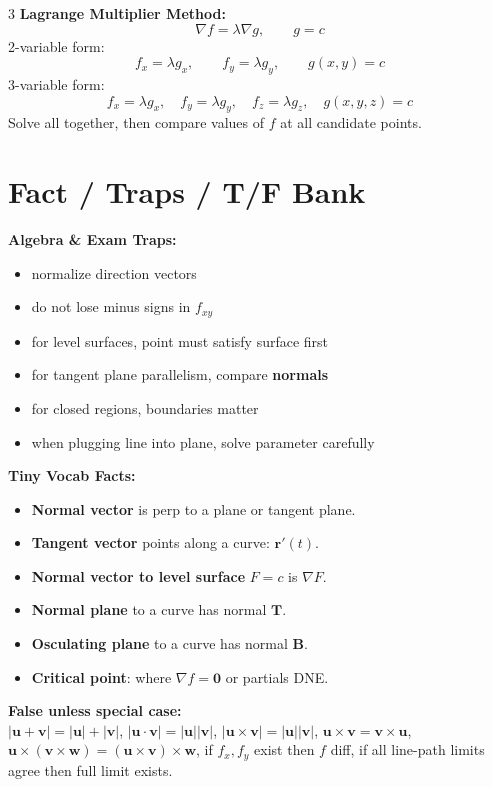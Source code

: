 \documentclass[12pt, landscape]{article}
\newcommand{\vct}[1]{\bm{#1}}
\newcommand{\abs}[1]{\left\lvert#1\right\rvert}
\newcommand{\dotp}{\!\cdot\!}
\newcommand{\grad}{\nabla}
\begin{document}
\begin{multicols}{3}
		\textbf{Lagrange Multiplier Method:}
		\[
		\grad f=\lambda \grad g,\qquad g=c
		\]
		2-variable form:
		\[
		f_x=\lambda g_x,\qquad f_y=\lambda g_y,\qquad g(x,y)=c
		\]
		3-variable form:
		\[
		f_x=\lambda g_x,\quad f_y=\lambda g_y,\quad f_z=\lambda g_z,\quad g(x,y,z)=c
		\]
		Solve all together, then compare values of $f$ at all candidate points.
		
		\section{Fact / Traps / T/F Bank}
		\textbf{Algebra \& Exam Traps:}
		\begin{itemize}
			\item normalize direction vectors
			\item do not lose minus signs in $f_{xy}$
			\item for level surfaces, point must satisfy surface first
			\item for tangent plane parallelism, compare \textbf{normals}
			\item for closed regions, boundaries matter
			\item when plugging line into plane, solve parameter carefully
		\end{itemize}
		
		\textbf{Tiny Vocab Facts:}
		\begin{itemize}
			\item \textbf{Normal vector} is perp to a plane or tangent plane.
			\item \textbf{Tangent vector} points along a curve: $\vct r'(t)$.
			\item \textbf{Normal vector to level surface} $F=c$ is $\grad F$.
			\item \textbf{Normal plane} to a curve has normal $\vct T$.
			\item \textbf{Osculating plane} to a curve has normal $\vct B$.
			\item \textbf{Critical point}: where $\grad f=\vct 0$ or partials DNE.
		\end{itemize}
		
		\textbf{False unless special case:}\\
		$\abs{\vct u+\vct v}=\abs{\vct u}+\abs{\vct v}$, \quad
		$\abs{\vct u\dotp\vct v}=\abs{\vct u}\abs{\vct v}$, \quad
		$\abs{\vct u\times\vct v}=\abs{\vct u}\abs{\vct v}$, \quad
		$\vct u\times\vct v=\vct v\times\vct u$, \quad
		$\vct u\times(\vct v\times\vct w)=(\vct u\times\vct v)\times\vct w$, \quad
		if $f_x,f_y$ exist then $f$ diff, \quad
		if all line-path limits agree then full limit exists.
		

\end{multicols}
\end{document}
